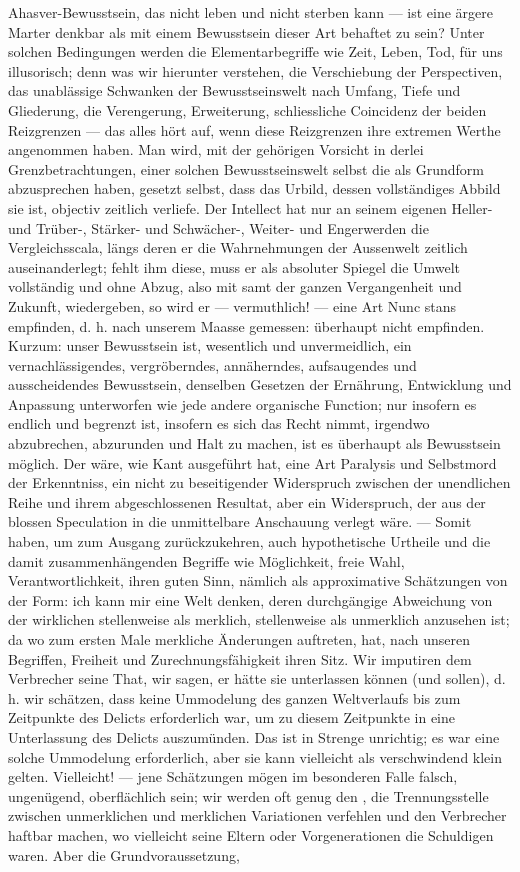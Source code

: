 Ahasver-Bewusstsein, das nicht leben und nicht sterben kann — ist eine ärgere Marter denkbar als mit einem Bewusstsein dieser Art behaftet zu sein? Unter solchen Bedingungen werden die Elementarbegriffe wie Zeit, Leben, Tod, für uns illusorisch; denn was wir hierunter verstehen, die Verschiebung der Perspectiven, das unablässige Schwanken der Bewusstseinswelt nach Umfang, Tiefe und Gliederung, die Verengerung, Erweiterung, schliessliche Coincidenz der beiden Reizgrenzen — das alles hört auf, wenn diese Reizgrenzen ihre extremen Werthe angenommen haben. Man wird, mit der gehörigen Vorsicht in derlei Grenzbetrachtungen, einer solchen Bewusstseinswelt selbst die  als Grundform abzusprechen haben, gesetzt selbst, dass das Urbild, dessen vollständiges Abbild sie ist, objectiv zeitlich verliefe. Der Intellect hat nur an seinem eigenen Heller- und Trüber-, Stärker- und Schwächer-, Weiter- und Engerwerden die Vergleichsscala, längs deren er die Wahrnehmungen der Aussenwelt zeitlich auseinanderlegt; fehlt ihm diese, muss er als absoluter Spiegel die Umwelt vollständig und ohne Abzug, also mit samt der ganzen Vergangenheit und Zukunft, wiedergeben, so wird er — vermuthlich! — eine Art Nunc stans empfinden, d. h. nach unserem Maasse gemessen: überhaupt nicht empfinden. Kurzum: unser Bewusstsein ist, wesentlich und unvermeidlich, ein vernachlässigendes, vergröberndes, annäherndes, aufsaugendes und ausscheidendes Bewusstsein, denselben Gesetzen der Ernährung, Entwicklung und Anpassung unterworfen wie jede andere organische Function; nur insofern es endlich und begrenzt ist, insofern es sich das Recht nimmt, irgendwo abzubrechen, abzurunden und Halt zu machen, ist es überhaupt als Bewusstsein möglich. Der  wäre, wie Kant ausgeführt hat, eine Art Paralysis und Selbstmord der Erkenntniss, ein nicht zu beseitigender Widerspruch zwischen der unendlichen Reihe und ihrem abgeschlossenen Resultat, aber ein Widerspruch, der aus der blossen Speculation in die unmittelbare Anschauung verlegt wäre. — Somit haben, um zum Ausgang zurückzukehren, auch hypothetische Urtheile und die damit zusammenhängenden Begriffe wie Möglichkeit, freie Wahl, Verantwortlichkeit, ihren guten Sinn, nämlich als approximative Schätzungen von der Form: ich kann mir eine Welt denken, deren durchgängige Abweichung von der wirklichen stellenweise als merklich, stellenweise als unmerklich anzusehen ist; da wo zum ersten Male merkliche Änderungen auftreten, hat, nach unseren Begriffen, Freiheit und Zurechnungsfähigkeit ihren Sitz. Wir imputiren dem Verbrecher seine That, wir sagen, er hätte sie unterlassen können (und sollen), d. h. wir schätzen, dass keine Ummodelung des ganzen Weltverlaufs bis zum Zeitpunkte des Delicts erforderlich war, um zu diesem Zeitpunkte in eine Unterlassung des Delicts auszumünden. Das ist in Strenge unrichtig; es war eine solche Ummodelung erforderlich, aber sie kann vielleicht als verschwindend klein gelten. Vielleicht! — jene Schätzungen mögen im besonderen Falle falsch, ungenügend, oberflächlich sein; wir werden oft genug den , die Trennungsstelle zwischen unmerklichen und merklichen Variationen verfehlen und den Verbrecher haftbar machen, wo vielleicht seine Eltern oder Vorgenerationen die Schuldigen waren. Aber die Grundvoraussetzung, 